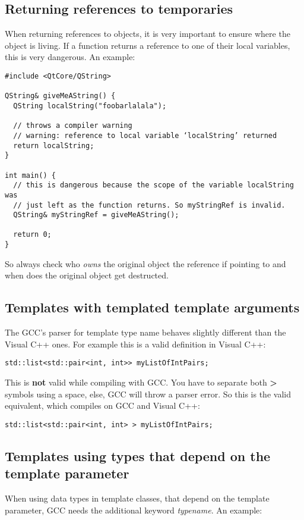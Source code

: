 \subsection{Returning references to temporaries} When returning references to objects, it is very important to ensure where the object is living. If a function returns a reference to one of their local variables, this is very dangerous. An example:
\begin{verbatim}
#include <QtCore/QString>

QString& giveMeAString() {
  QString localString("foobarlalala");

  // throws a compiler warning
  // warning: reference to local variable ‘localString’ returned
  return localString;
}

int main() {
  // this is dangerous because the scope of the variable localString was 
  // just left as the function returns. So myStringRef is invalid.
  QString& myStringRef = giveMeAString();

  return 0;
}
\end{verbatim}
So always check who \emph{owns} the original object the reference if pointing to and when does the original object get destructed.

\subsection{Templates with templated template arguments} The GCC's parser for template type name behaves slightly different than the Visual C++ ones. For example this is a valid definition in Visual C++: 
\begin{verbatim}
std::list<std::pair<int, int>> myListOfIntPairs; 
\end{verbatim}

This is \textbf{not} valid while compiling with GCC. You have to separate both \textbf{>} symbols using a space, else, GCC will throw a parser error. So this is the valid equivalent, which compiles on GCC and Visual C++: 
\begin{verbatim}
std::list<std::pair<int, int> > myListOfIntPairs; 
\end{verbatim}

\subsection{Templates using types that depend on the template parameter} When using data types in template classes, that depend on the template parameter, GCC needs the additional keyword \emph{typename}. An example:

